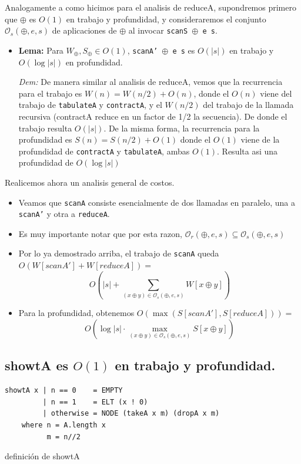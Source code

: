 \documentclass[12pt]{article}
\begin{document}
Analogamente a como hicimos para el analisis de reduceA, supondremos primero que $\oplus$ es $O(1)$ en trabajo y profundidad, y consideraremos el conjunto $\mathcal{O}_s(\oplus,e,s)$ de aplicaciones de $\oplus$ al invocar \texttt{scanS $\oplus$ e s}.

\begin{itemize}
\item \textbf{Lema:} Para $W_\oplus,S_\oplus \in O(1)$, \texttt{scanA' $\oplus$ e s} es $O(|s|)$ en trabajo y $O(\log |s|)$ en profundidad.

 \textit{Dem:} De manera similar al analisis de reduceA, vemos que la recurrencia para el trabajo es $W(n) = W(n/2) + O(n)$, donde el $O(n)$  viene del trabajo de \texttt{tabulateA} y \texttt{contractA}, y el $W(n/2)$ del trabajo de la llamada recursiva (contractA reduce en un factor de 1/2 la secuencia). De donde el trabajo resulta $O(|s|)$. De la misma forma, la recurrencia para la profundidad es $S(n) = S(n/2) + O(1)$ donde el $O(1)$ viene de la profundidad de \texttt{contractA} y \texttt{tabulateA}, ambas $O(1)$. Resulta asi una profundidad de $O(\log |s|)$
\end{itemize}

Realicemos ahora un analisis general de costos.

\begin{itemize}
\item Veamos que \texttt{scanA} consiste esencialmente de dos llamadas en paralelo, una a \texttt{scanA'} y otra a \texttt{reduceA}.

\item Es muy importante notar que por esta razon, $\mathcal{O}_r(\oplus,e,s) \subseteq \mathcal{O}_s(\oplus,e,s)$

\item Por lo ya demostrado arriba, el trabajo de \texttt{scanA} queda $O(W[scanA'] + W[reduceA]) =$ $$O(|s| + \sum\limits_{(x\oplus y)\in\mathcal{O}_s(\oplus,e,s)} W[x\oplus y])$$

\item Para la profundidad, obtenemos $O(\max (S[scanA'], S[reduceA])) = $ $$O(\log |s|\cdot \max\limits_{(x\oplus y)\in\mathcal{O}_s(\oplus,e,s)} S[x\oplus y])$$
\end{itemize}
\subsection{showtA es $O(1)$ en trabajo y profundidad.}

\begin{table}[h]
\begin{lstlisting}
showtA x | n == 0    = EMPTY 
         | n == 1    = ELT (x ! 0)
         | otherwise = NODE (takeA x m) (dropA x m)
    where n = A.length x
          m = n//2
\end{lstlisting}
\caption{definición de showtA}
\end{table}
\end{document}
